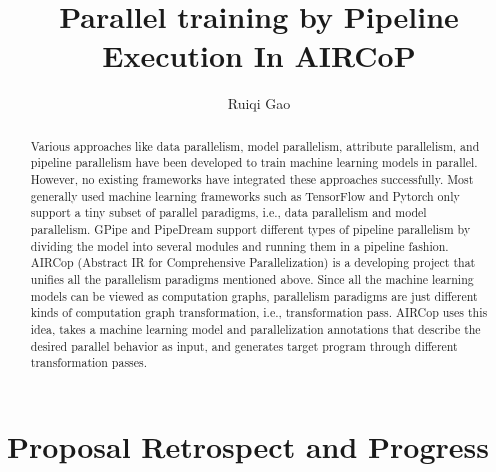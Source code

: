 \documentclass[sigplan, nonacm]{acmart}\settopmatter{printfolios=true,printccs=false,printacmref=false}
\begin{document}
\sloppy

\title{Parallel training by Pipeline Execution In AIRCoP}

\author{Ruiqi Gao}

\begin{abstract}
  Various approaches like data parallelism, model parallelism, attribute parallelism, and pipeline parallelism have been developed to train machine learning models in parallel. However, no existing frameworks have integrated these approaches successfully. Most generally used machine learning frameworks such as TensorFlow and Pytorch only support a tiny subset of parallel paradigms, i.e., data parallelism and model parallelism. GPipe and PipeDream support different types of pipeline parallelism by dividing the model into several modules and running them in a pipeline fashion.
  AIRCop (Abstract IR for Comprehensive Parallelization) is a developing project that unifies all the parallelism paradigms mentioned above. Since all the machine learning models can be viewed as computation graphs, parallelism paradigms are just different kinds of computation graph transformation, i.e., transformation pass. AIRCop uses this idea, takes a machine learning model and parallelization annotations that describe the desired parallel behavior as input, and generates target program through different transformation passes.

\end{abstract}


\maketitle
\section{Proposal Retrospect and Progress}
\end{document}
